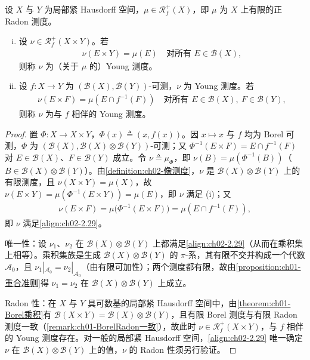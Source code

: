 \documentclass[../../main.tex]{subfiles}%
\begin{document}
\begin{definition}\label{definition:ch02-Young测度}
设 $X$ 与 $Y$ 为局部紧 Hausdorff 空间，$\mu\in\mathscr R^+_f(X)$，即 $\mu$ 为 $X$ 上有限的正 Radon 测度。
\begin{enumerate}[(i)]
\item 设 $\nu\in\mathscr R^+_f(X\times Y)$。若
\begin{align*}
\nu(E\times Y)=\mu(E)\quad\text{对所有 }E\in\mathscr B(X),
\end{align*}
则称 $\nu$ 为（关于 $\mu$ 的）Young 测度。
\item 设 $f:X\to Y$ 为 $(\mathscr B(X),\mathscr B(Y))$-可测，$\nu$ 为 Young 测度。若
\begin{align}
\nu(E\times F)=\mu(E\cap f^{-1}(F))\quad\text{对所有 }E\in\mathscr B(X),\ F\in\mathscr B(Y), \label{align:ch02-2.29}
\end{align}
则称 $\nu$ 为与 $f$ 相伴的 Young 测度。
\end{enumerate}
\end{definition}

\begin{proof}
置 $\Phi:X\to X\times Y$，$\Phi(x)\triangleq(x,f(x))$。因 $x\mapsto x$ 与 $f$ 均为 Borel 可测，$\Phi$ 为 $(\mathscr B(X),\mathscr B(X)\otimes\mathscr B(Y))$-可测；又 $\Phi^{-1}(E\times F)=E\cap f^{-1}(F)$ 对 $E\in\mathscr B(X)$、$F\in\mathscr B(Y)$ 成立。令 $\nu\triangleq\mu_\Phi$，即 $\nu(B)=\mu(\Phi^{-1}(B))$（$B\in\mathscr B(X)\otimes\mathscr B(Y)$）。由\cref{definition:ch02-像测度}，$\nu$ 是 $\mathscr B(X)\otimes\mathscr B(Y)$ 上的有限测度，且 $\nu(X\times Y)=\mu(X)$，故 $\nu(E\times Y)=\mu(\Phi^{-1}(E\times Y))=\mu(E)$，即 $\nu$ 满足 (i)；又
\begin{align*}
\nu(E\times F)=\mu\bigl(\Phi^{-1}(E\times F)\bigr)=\mu(E\cap f^{-1}(F)),
\end{align*}
即 $\nu$ 满足\eqref{align:ch02-2.29}。

唯一性：设 $\nu_1$、$\nu_2$ 在 $\mathscr B(X)\otimes\mathscr B(Y)$ 上都满足\eqref{align:ch02-2.29}（从而在乘积集上相等）。乘积集族是生成 $\mathscr B(X)\otimes\mathscr B(Y)$ 的 $\pi$-系，其有限不交并构成一个代数 $\mathcal A_0$，且 $\nu_1|_{\mathcal A_0}=\nu_2|_{\mathcal A_0}$（由有限可加性）；两个测度都有限，故由\cref{proposition:ch01-重合准则}得 $\nu_1=\nu_2$ 在 $\mathscr B(X)\otimes\mathscr B(Y)$ 上成立。

Radon 性：在 $X$ 与 $Y$ 具可数基的局部紧 Hausdorff 空间中，由\cref{theorem:ch01-Borel乘积}有 $\mathscr B(X\times Y)=\mathscr B(X)\otimes\mathscr B(Y)$，且有限 Borel 测度与有限 Radon 测度一致（\cref{remark:ch01-BorelRadon一致}），故此时 $\nu\in\mathscr R^+_f(X\times Y)$，与 $f$ 相伴的 Young 测度存在。对一般的局部紧 Hausdorff 空间，\eqref{align:ch02-2.29} 唯一确定 $\nu$ 在 $\mathscr B(X)\otimes\mathscr B(Y)$ 上的值，$\nu$ 的 Radon 性须另行验证。
\end{proof}
\end{document}
